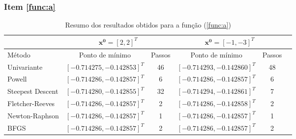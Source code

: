 \documentclass[10pt, a4paper]{article}
\begin{document}
\subsubsection{Item \ref{func:a}}

\begin{table}[htpb]
  \centering
  \begin{tabular}{|l|c|c|c|c|c|}
    \cline{2-5}
    \multicolumn{1}{c}{} \vline
    & 
    \multicolumn{2}{c}{$\mathbf{x^0} = [2, 2]^T$} \vline
    & 
    \multicolumn{2}{c}{$\mathbf{x^0} = [-1, -3]^T$} \vline \\
    \hline%
    Método             &	Ponto de mínimo	          & Passos	&  Ponto de mínimo	          &  Passos   \\
    \hline
    Univariante        & $[-0.714275, -0.142853]^T$ & 46      &  $[-0.714293, -0.142860]^T$ &  48       \\
    Powell             & $[-0.714286, -0.142857]^T$ & 6       &  $[-0.714286, -0.142857]^T$ &  6        \\
    Steepest Descent   & $[-0.714280, -0.142855]^T$ & 32      &  $[-0.714294, -0.142861]^T$ &  7        \\
    Fletcher-Reeves    & $[-0.714286, -0.142857]^T$ & 2       &  $[-0.714286, -0.142858]^T$ &  2        \\
    Newton-Raphson     & $[-0.714286, -0.142857]^T$ & 1       &  $[-0.714286, -0.142857]^T$ &  1        \\
    BFGS               & $[-0.714286, -0.142857]^T$ & 2       &  $[-0.714286, -0.142857]^T$ &  2        \\
    \hline
  \end{tabular}
  \caption{Resumo dos resultados obtidos para a função (\ref{func:a})}
  \label{tab:q1a_results}
\end{table}
\end{document}
